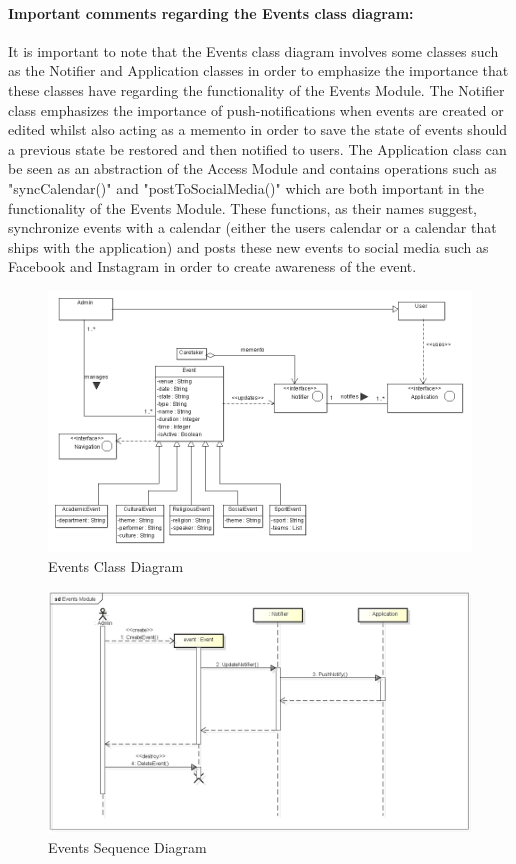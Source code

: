 \documentclass[11pt]{article}
\begin{document}
	\paragraph{Important comments regarding the Events class diagram: }	
	It is important to note that the Events class diagram involves some classes such as the Notifier and Application classes in order to emphasize the importance that these classes have regarding the functionality of the Events Module. 
The Notifier class emphasizes the importance of push-notifications when events are created or edited whilst also acting as a memento in order to save the state of events should a previous state be restored and then notified to users.
The Application class can be seen as an abstraction of the Access Module and contains operations such as "syncCalendar()" and "postToSocialMedia()" which are both important in the functionality of the Events Module. These functions, as their names suggest, synchronize events with a calendar (either the users calendar or a calendar that ships with the application) and posts these new events to social media such as Facebook and Instagram in order to create awareness of the event.

    \begin{figure}[!h]
        \centering
        \includegraphics[width=\textwidth]{Diagrams/Events/EventsClassDiagram}
        \caption{Events Class Diagram}
        \label{fig:events_class}
    \end{figure}
     \begin{figure}[!h]
        \centering
        \includegraphics[width=\textwidth]{Diagrams/Events/EventsSequenceDiagramFinal}
        \caption{Events Sequence Diagram}
        \label{fig:events_sequence}
    \end{figure}
\end{document}
